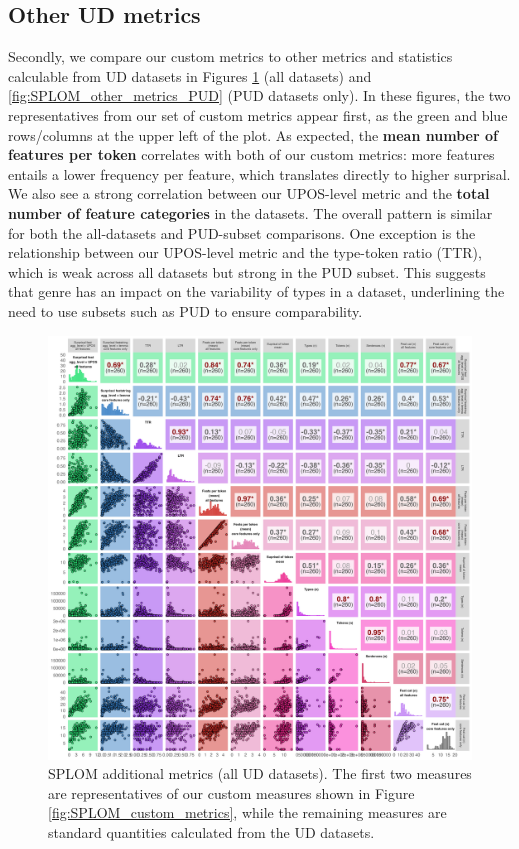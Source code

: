 \documentclass[USenglish]{article}
\begin{document}
\subsection{Other UD metrics}

Secondly, we compare our custom metrics to other metrics and statistics calculable from UD datasets in Figures \ref{fig:SPLOM_other_metrics} (all datasets) and \ref{fig:SPLOM_other_metrics_PUD} (PUD datasets only).
In these figures, the two representatives from our set of custom metrics appear first, as the green and blue rows/columns at the upper left of the plot.
As expected, the \textbf{mean number of features per token} correlates with both of our custom metrics: more features entails a lower frequency per feature, which translates directly to higher surprisal.
We also see a strong correlation between our UPOS-level metric and the \textbf{total number of feature categories} in the datasets. 
The overall pattern is similar for both the all-datasets and PUD-subset comparisons.
One exception is the relationship between our UPOS-level metric and the type-token ratio (TTR), which is weak across all datasets but strong in the PUD subset. 
This suggests that genre has an impact on the variability of types in a dataset, underlining the need to use subsets such as PUD to ensure comparability.

\begin{figure}
    \centering
        \includegraphics[width=1\linewidth]{latex/graphics/SPLOM_other_metrics.png}
    \caption{SPLOM additional metrics  (all UD datasets). The first two measures are representatives of our custom measures shown in Figure \ref{fig:SPLOM_custom_metrics}, while the remaining measures are standard quantities calculated from the UD datasets.}
    \label{fig:SPLOM_other_metrics}
\end{figure}
\end{document}
